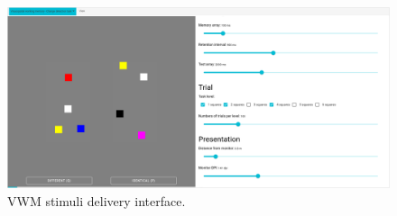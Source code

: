 \begin{figure}[H]
\begin{centering}
% 
\includegraphics[width=1\textwidth]{Appendix/databases/Figures/vwm-delivery.png}
\par\end{centering}
\caption{\gls*{VWM} stimuli delivery interface.}
\label{}
\end{figure}